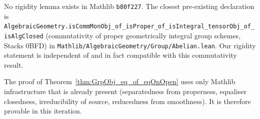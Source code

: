 No rigidity lemma exists in Mathlib \texttt{b80f227}. The closest pre-existing declaration is \lstinline{AlgebraicGeometry.isCommMonObj_of_isProper_of_isIntegral_tensorObj_of_isAlgClosed} (commutativity of proper geometrically integral group schemes, Stacks 0BFD) in \lstinline{Mathlib/AlgebraicGeometry/Group/Abelian.lean}. Our rigidity statement is independent of and in fact compatible with this commutativity result.

The proof of Theorem~\ref{thm:GrpObj_eq_of_eqOnOpen} uses only Mathlib infrastructure that is already present (separatedness from properness, equaliser closedness, irreducibility of source, reducedness from smoothness). It is therefore provable in this iteration.
